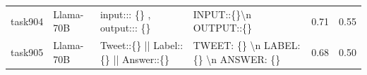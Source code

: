 \begin{longtable}{@{}p{0.8cm\tiny}p{1cm\tiny}p{4.1cm\ttfamily\tiny}p{4.1cm\ttfamily\tiny}p{0.8cm\tiny}p{0.8cm\tiny}@{}}
task904   & Llama-70B  & input::: \{\} ,  output::: \{\}                                                                                                                                                                                                                                                                                                                                                                                                                                                                                         & INPUT::\{\}\textbackslash{}n OUTPUT::\{\}                                                                                                                                                                                                                                                                                                                                                                                                                                                                                                                                         & 0.71 & 0.55 \\
task905   & Llama-70B  & Tweet::\{\} || Label::\{\} || Answer::\{\}                                                                                                                                                                                                                                                                                                                                                                                                                                                                              & TWEET: \{\} \textbackslash{}n LABEL: \{\} \textbackslash{}n ANSWER: \{\}                                                                                                                                                                                                                                                                                                                                                                                                                                                                                                          & 0.68 & 0.50 \\

\end{longtable}

